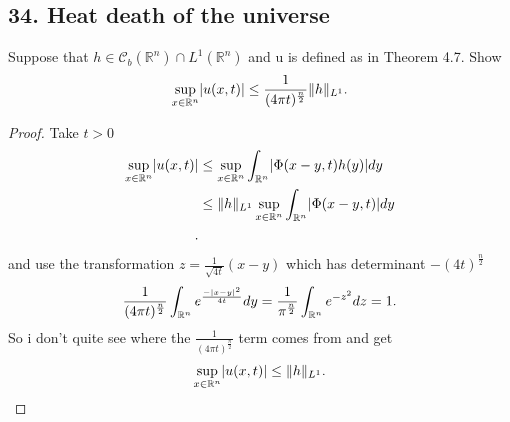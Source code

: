  \subsection*{34. Heat death of the universe}
  \begin{exercise}[a]
   Suppose that $h \in  \mathcal{C}_b(\mathbb{R}^{n} ) \cap L^{1}(\mathbb{R}^{n} ) $ and u is defined as in Theorem 4.7. Show
   \begin{align*}
     \sup_{x \in  \mathbb{R}^{n} } \lvert u(x,t)\rvert \le \frac{1}{(4\pi t)^{\frac{n}{2}} }\|h\|_{L^{1} }
   .\end{align*}
  \end{exercise}
  \begin{proof}
    Take $t>0$
   \begin{align*}
     \sup_{x \in  \mathbb{R}^{n} } \lvert u(x,t)\rvert &\le   \sup_{x \in  \mathbb{R}^{n} }\int_{\mathbb{R}^{n} }\lvert\Phi(x-y,t)h(y)\rvert dy\\
                                                &\le  \|h\|_{L^{1} }  \sup_{x \in  \mathbb{R}^{n} } \int_{\mathbb{R}^{n} } \lvert\Phi(x-y,t)\rvert dy\\
   .\end{align*} 
   and use the transformation  $z=\frac{1}{\sqrt{4t} }(x-y)$ which has determinant $-(4t)^{\frac{n}{2}} $
   \begin{align*}
     \frac{1}{(4\pi t)^{\frac{n}{2}} } \int_{\mathbb{R}^{n} } e^{\frac{-\lvert x-y\rvert^2}{4t}} dy   = \frac{1}{\pi^{\frac{n}{2}} } \int_{\mathbb{R}^{n} } e^{-z^2}  dz = 1
   .\end{align*}
   So i don't quite see where the $\frac{1}{(4\pi t)^{\frac{n}{2}} }$ term comes from and get
   \begin{align*}
    \sup_{x \in  \mathbb{R}^{n} } \lvert u(x,t)\rvert \le \|h\|_{L^{1} }
   .\end{align*}
  \end{proof}

